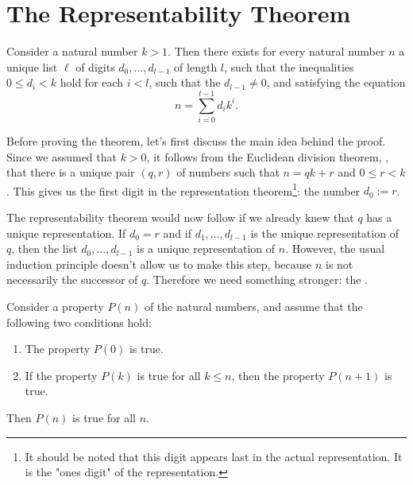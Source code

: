\section{The Representability Theorem}

\begin{theorem}\label{theorem:representability}
  Consider a natural number $k>1$. Then there exists for every natural number $n$ a unique list $\ell$ of digits $d_0,\ldots,d_{l-1}$ of length $l$, such that the inequalities $0\leq d_i<k$ hold for each $i<l$, such that the  $d_{l-1}\neq 0$, and satisfying the equation
  \begin{equation*}
    n= \sum_{i=0}^{l-1}d_i k^i.
  \end{equation*}
\end{theorem}

Before proving the theorem, let's first discuss the main idea behind the proof. Since we assumed that $k>0$, it follows from the Euclidean division theorem, , that there is a unique pair $(q,r)$ of numbers such that $n=qk+r$ and $0\leq r<k$. This gives us the first digit in the representation theorem\footnote{It should be noted that this digit appears last in the actual representation. It is the "ones digit" of the representation.}: the number $d_0:=r$.

The representability theorem would now follow if we already knew that $q$ has a unique representation. If $d_0=r$ and if $d_1,\ldots,d_{l-1}$ is the unique representation of $q$, then the list $d_0,\ldots,d_{l-1}$ is a unique representation of $n$. However, the usual induction principle doesn't allow us to make this step, because $n$ is not necessarily the successor of $q$. Therefore we need something stronger: the .

\begin{theorem}\label{theorem:strong-induction}
  Consider a property $P(n)$ of the natural numbers, and assume that the following two conditions hold:
  \begin{enumerate}
  \item The property $P(0)$ is true.
  \item If the property $P(k)$ is true for all $k\leq n$, then the property $P(n+1)$ is true.
  \end{enumerate}
  Then $P(n)$ is true for all $n$.
\end{theorem}

